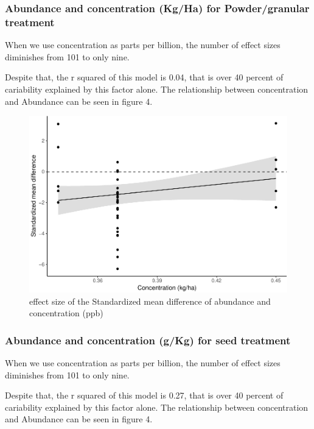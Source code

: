 \documentclass[]{elsarticle} %
\makeatletter
\def\maxwidth{\ifdim\Gin@nat@width>\linewidth\linewidth
\else\Gin@nat@width\fi}
\let\Oldincludegraphics\includegraphics
\renewcommand{\includegraphics}[1]{\Oldincludegraphics[width=\maxwidth]{#1}}
\makeatother
\begin{document}
\subsubsection{Abundance and concentration (Kg/Ha) for Powder/granular
treatment}\label{abundance-and-concentration-kgha-for-powdergranular-treatment}

When we use concentration as parts per billion, the number of effect
sizes diminishes from 101 to only nine.

Despite that, the r squared of this model is 0.04, that is over 40
percent of cariability explained by this factor alone. The relationship
between concentration and Abundance can be seen in figure 4.

\begin{figure}[htbp]
\centering
\includegraphics{MetanalysisNeonics_files/figure-latex/unnamed-chunk-11-1.pdf}
\caption{effect size of the Standardized mean difference of abundance
and concentration (ppb)}
\end{figure}

\subsubsection{Abundance and concentration (g/Kg) for seed
treatment}\label{abundance-and-concentration-gkg-for-seed-treatment}

When we use concentration as parts per billion, the number of effect
sizes diminishes from 101 to only nine.

Despite that, the r squared of this model is 0.27, that is over 40
percent of cariability explained by this factor alone. The relationship
between concentration and Abundance can be seen in figure 4.
\end{document}
